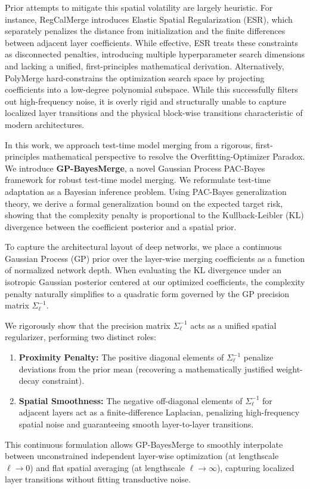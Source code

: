 Prior attempts to mitigate this spatial volatility are largely heuristic. For
instance, RegCalMerge \cite{trial2_submission1} introduces Elastic Spatial
Regularization (ESR), which separately penalizes the distance from
initialization and the finite differences between adjacent layer coefficients.
While effective, ESR treats these constraints as disconnected penalties,
introducing multiple hyperparameter search dimensions and lacking a unified,
first-principles mathematical derivation. Alternatively, PolyMerge
\cite{trial2_submission3} hard-constrains the optimization search space by
projecting coefficients into a low-degree polynomial subspace. While this
successfully filters out high-frequency noise, it is overly rigid and
structurally unable to capture localized layer transitions and the physical
block-wise transitions characteristic of modern architectures.

In this work, we approach test-time model merging from a rigorous,
first-principles mathematical perspective to resolve the Overfitting-Optimizer
Paradox. We introduce \textbf{GP-BayesMerge}, a novel Gaussian Process PAC-Bayes
framework for robust test-time model merging. We reformulate test-time
adaptation as a Bayesian inference problem. Using PAC-Bayes generalization
theory, we derive a formal generalization bound on the expected target risk,
showing that the complexity penalty is proportional to the Kullback-Leibler (KL)
divergence between the coefficient posterior and a spatial prior.

To capture the architectural layout of deep networks, we place a continuous
Gaussian Process (GP) prior over the layer-wise merging coefficients as a
function of normalized network depth. When evaluating the KL divergence under an
isotropic Gaussian posterior centered at our optimized coefficients, the
complexity penalty naturally simplifies to a quadratic form governed by the GP
precision matrix $\Sigma_{\ell}^{-1}$.

We rigorously show that the precision matrix $\Sigma_{\ell}^{-1}$ acts as a
unified spatial regularizer, performing two distinct roles:
\begin{enumerate}
    \item \textbf{Proximity Penalty:} The positive diagonal elements of
    $\Sigma_{\ell}^{-1}$ penalize deviations from the prior mean (recovering a
    mathematically justified weight-decay constraint).
    \item \textbf{Spatial Smoothness:} The negative off-diagonal elements of
    $\Sigma_{\ell}^{-1}$ for adjacent layers act as a finite-difference
    Laplacian, penalizing high-frequency spatial noise and guaranteeing smooth
    layer-to-layer transitions.
\end{enumerate}
This continuous formulation allows GP-BayesMerge to smoothly interpolate between
unconstrained independent layer-wise optimization (at lengthscale $\ell \to 0$)
and flat spatial averaging (at lengthscale $\ell \to \infty$), capturing
localized layer transitions without fitting transductive noise.


